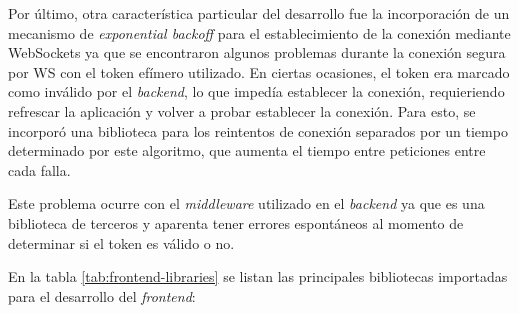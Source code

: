 Por último, otra característica particular del desarrollo fue la incorporación de un mecanismo de \textit{exponential backoff} para el establecimiento de la conexión mediante WebSockets ya que se encontraron algunos problemas durante la conexión segura por WS con el token efímero utilizado. En ciertas ocasiones, el token era marcado como inválido por el \textit{backend}, lo que impedía establecer la conexión, requieriendo refrescar la aplicación y volver a probar establecer la conexión. Para esto, se incorporó una biblioteca para los reintentos de conexión separados por un tiempo determinado por este algoritmo, que aumenta el tiempo entre peticiones entre cada falla\citep{BACKOFF:1}.

Este problema ocurre con el \textit{middleware} utilizado en el \textit{backend} ya que es una biblioteca de terceros y aparenta tener errores espontáneos al momento de determinar si el token es válido o no.


En la tabla \ref{tab:frontend-libraries} se listan las principales bibliotecas importadas para el desarrollo del \textit{frontend}: 

